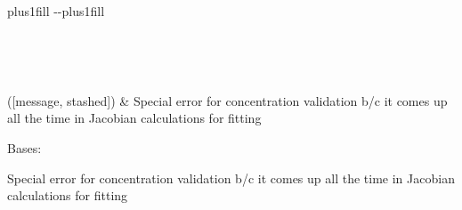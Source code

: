 \documentclass[letterpaper,10pt,english]{sphinxmanual}
\begin{document}
\begin{savenotes}
\sphinxatlongtablestart
\sphinxthistablewithglobalstyle
\sphinxthistablewithnovlinesstyle
\makeatletter
  \LTleft \@totalleftmargin plus1fill
  \LTright\dimexpr\columnwidth-\@totalleftmargin-\linewidth\relax plus1fill
\makeatother
\begin{longtable}{}
\sphinxtoprule
\endfirsthead

\\
\sphinxtoprule
\endhead

\sphinxbottomrule
{}\\
\endfoot

\endlastfoot
\sphinxtableatstartofbodyhook

\sphinxAtStartPar
{\hyperref[\detokenize{generated/photon_canon.contrib.bio:photon_canon.contrib.bio.ConcentrationError}]{}}({[}message, stashed{]})
&
\sphinxAtStartPar
Special error for concentration validation b/c it comes up all the time in Jacobian calculations for fitting
\\
\sphinxbottomrule
\end{longtable}
\sphinxtableafterendhook
\sphinxatlongtableend
\end{savenotes}

\begin{fulllineitems}
\label{\detokenize{generated/photon_canon.contrib.bio:photon_canon.contrib.bio.ConcentrationError}}
\pysigstartsignatures
\pysiglinewithargsret
{}
{\sphinxparamcomma {}}
{}
\pysigstopsignatures
\sphinxAtStartPar
Bases: {\hyperref[\detokenize{generated/photon_canon.utils:photon_canon.utils.OpticalPropertyError}]{}}

\sphinxAtStartPar
Special error for concentration validation b/c it comes up all the time in Jacobian calculations for fitting

\end{fulllineitems}
\end{document}
